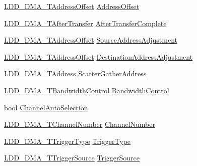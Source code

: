\begin{DoxyCompactItemize}
\item 
\hyperlink{group___p_e___types__module_ga3e4ae49348fdee472624efd76ed25476}{L\+D\+D\+\_\+\+D\+M\+A\+\_\+\+T\+Address\+Offset} \hyperlink{struct_l_d_d___d_m_a___t_transfer_descriptor_aff47307126179fdf6b241ca1b7371256}{Address\+Offset}
\item 
\hyperlink{group___p_e___types__module_ga646a7b557e76b22ad67634a484f3e352}{L\+D\+D\+\_\+\+D\+M\+A\+\_\+\+T\+After\+Transfer} \hyperlink{struct_l_d_d___d_m_a___t_transfer_descriptor_ad6046f40169d2ea20061906342615380}{After\+Transfer\+Complete}
\item 
\hyperlink{group___p_e___types__module_ga3e4ae49348fdee472624efd76ed25476}{L\+D\+D\+\_\+\+D\+M\+A\+\_\+\+T\+Address\+Offset} \hyperlink{struct_l_d_d___d_m_a___t_transfer_descriptor_a94b33d7047554bd56007938621555db9}{Source\+Address\+Adjustment}
\item 
\hyperlink{group___p_e___types__module_ga3e4ae49348fdee472624efd76ed25476}{L\+D\+D\+\_\+\+D\+M\+A\+\_\+\+T\+Address\+Offset} \hyperlink{struct_l_d_d___d_m_a___t_transfer_descriptor_a6a303eeea7580d78f59f12496c979954}{Destination\+Address\+Adjustment}
\item 
\hyperlink{group___p_e___types__module_gab8287f62db7ff96992355760b652cd07}{L\+D\+D\+\_\+\+D\+M\+A\+\_\+\+T\+Address} \hyperlink{struct_l_d_d___d_m_a___t_transfer_descriptor_a7f82141e759573990f90002be3f12509}{Scatter\+Gather\+Address}
\item 
\hyperlink{group___p_e___types__module_ga4431f6bedff7b393e7896c9712649ed4}{L\+D\+D\+\_\+\+D\+M\+A\+\_\+\+T\+Bandwidth\+Control} \hyperlink{struct_l_d_d___d_m_a___t_transfer_descriptor_a163633695c0c3e1a057dffae0e722d16}{Bandwidth\+Control}
\item 
bool \hyperlink{struct_l_d_d___d_m_a___t_transfer_descriptor_aae81aa421cebab862ae4b8ca9d384318}{Channel\+Auto\+Selection}
\item 
\hyperlink{group___p_e___types__module_gad268d607015891269cb015faa8bc0dac}{L\+D\+D\+\_\+\+D\+M\+A\+\_\+\+T\+Channel\+Number} \hyperlink{struct_l_d_d___d_m_a___t_transfer_descriptor_a22d5f3770a3c62c4bb7e426b4d5d96c8}{Channel\+Number}
\item 
\hyperlink{group___p_e___types__module_ga5590e47d6e7263ae9257e0d231c89521}{L\+D\+D\+\_\+\+D\+M\+A\+\_\+\+T\+Trigger\+Type} \hyperlink{struct_l_d_d___d_m_a___t_transfer_descriptor_a1d1ff275b5c883b0cad1b20ef1929716}{Trigger\+Type}
\item 
\hyperlink{group___p_e___types__module_ga8af21cbad27c8d061a98924a11fc5a9b}{L\+D\+D\+\_\+\+D\+M\+A\+\_\+\+T\+Trigger\+Source} \hyperlink{struct_l_d_d___d_m_a___t_transfer_descriptor_a770d0bde209b081eafe87892ed333084}{Trigger\+Source}

\end{DoxyCompactItemize}
